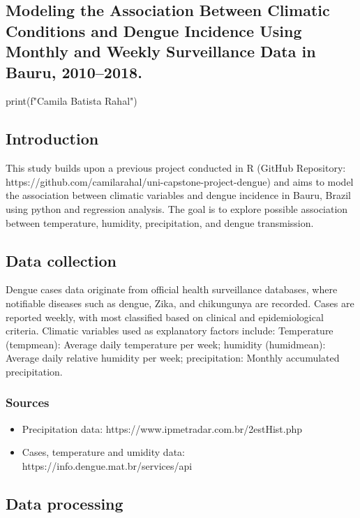\documentclass{article}
\begin{document}
\begin{center}
\section*{Modeling the Association Between Climatic Conditions and Dengue Incidence Using Monthly and Weekly Surveillance Data in Bauru, 2010–2018.}

\begin{pycode}
print(f"Camila Batista Rahal")
\end{pycode}
\end{center}

\subsection*{Introduction}
This study builds upon a previous project conducted in R (GitHub Repository: https://github.com/camilarahal/uni-capstone-project-dengue) and aims to model the association between climatic variables and dengue incidence in Bauru, Brazil using python and regression analysis. The goal is to explore possible association between temperature, humidity, precipitation, and dengue transmission.


\subsection*{Data collection}
Dengue cases data originate from official health surveillance databases, where notifiable diseases such as dengue, Zika, and chikungunya are recorded. Cases are reported weekly, with most classified based on clinical and epidemiological criteria. Climatic variables used as explanatory factors include: Temperature (tempmean): Average daily temperature per week; humidity (humidmean): Average daily relative humidity per week; precipitation: Monthly accumulated precipitation.

\subsubsection*{Sources}

\begin{itemize}
    \item Precipitation data: https://www.ipmetradar.com.br/2estHist.php
    \item Cases, temperature and umidity data: https://info.dengue.mat.br/services/api
\end{itemize}

\subsection*{Data processing}
\end{document}
